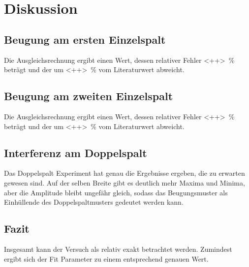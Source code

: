 \section{Diskussion}
\label{sec:Diskussion}

\subsection{Beugung am ersten Einzelspalt}
Die Ausgleichsrechnung ergibt einen Wert, dessen relativer Fehler \SI{<++>}{\percent} beträgt und der um \SI{<++>}{\percent} vom Literaturwert abweicht. 


\subsection{Beugung am zweiten Einzelspalt}
Die Ausgleichsrechnung ergibt einen Wert, dessen relativer Fehler \SI{<++>}{\percent} beträgt und der um \SI{<++>}{\percent} vom Literaturwert abweicht. 

\subsection{Interferenz am Doppelspalt}

Das Doppelspalt Experiment hat genau die Ergebnisse ergeben, die zu erwarten gewesen sind. Auf der selben Breite gibt es deutlich mehr Maxima und Minima, aber die Amplitude bleibt ungefähr gleich, sodass das Beugungsmuster als Einhüllende des Doppelspaltmusters gedeutet werden kann. 

\subsection{Fazit} 

Insgesamt kann der Versuch als relativ exakt betrachtet werden. Zumindest ergibt sich der Fit Parameter zu einem entsprechend genauen Wert. 
